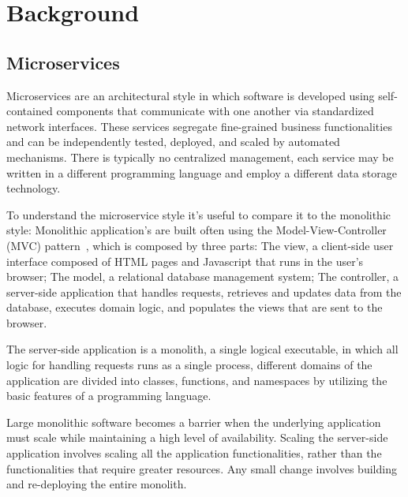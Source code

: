 
%

\chapter{Background}
\label{cha:background}

\section{Microservices} %
\label{sec:microservices}

Microservices \cite{microservices, microservices2017tenets, microservicesTomorrow} are an architectural style in which software is developed using self-contained components that
communicate with one another via standardized network interfaces.
These services segregate fine-grained business functionalities and can be independently tested, deployed, and scaled by automated mechanisms.
There is typically no centralized management, each service may be written in a different programming language and employ a different data storage technology.

To understand the microservice style it's useful to compare it to the monolithic style:
Monolithic application's are built often using the Model-View-Controller (MVC) pattern~\cite{mvc}, which is composed by three parts:
The view, a client-side user interface composed of HTML pages and Javascript that runs in the user's browser;
The model, a relational database management system;
The controller, a server-side application that handles requests, retrieves and updates data from the database, executes domain logic,
and populates the views that are sent to the browser.

The server-side application is a monolith, a single logical executable, in which all logic for handling requests runs as a single process,
different domains of the application are divided into classes, functions, and namespaces by utilizing the basic features of a programming language.

Large monolithic software becomes a barrier when the underlying application must scale while maintaining a high level of availability.
Scaling the server-side application involves scaling all the application functionalities, rather than the functionalities that require greater resources.
Any small change involves building and re-deploying the entire monolith.

